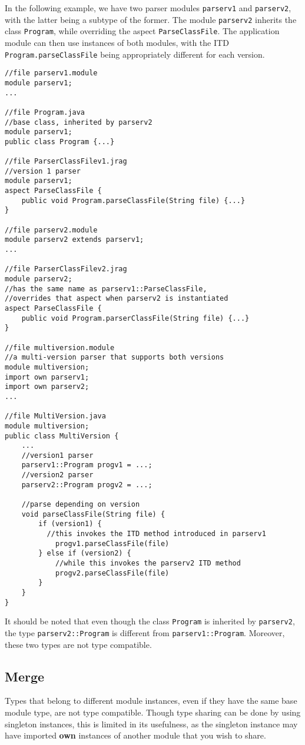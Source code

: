 In the following example, we have two parser modules \texttt{parserv1} and \texttt{parserv2},
with the latter being a subtype of the former. The module \texttt{parserv2} inherits
the class \texttt{Program}, while overriding the aspect \texttt{ParseClassFile}. The
application module can then use instances of both modules, with the ITD \texttt{Program.parseClassFile}
being appropriately different for each version.

\begin{lstlisting}
//file parserv1.module
module parserv1;
...

//file Program.java
//base class, inherited by parserv2
module parserv1;
public class Program {...}

//file ParserClassFilev1.jrag
//version 1 parser
module parserv1;
aspect ParseClassFile {
	public void Program.parseClassFile(String file) {...}
}

//file parserv2.module
module parserv2 extends parserv1;
...

//file ParserClassFilev2.jrag
module parserv2;
//has the same name as parserv1::ParseClassFile, 
//overrides that aspect when parserv2 is instantiated
aspect ParseClassFile {
	public void Program.parserClassFile(String file) {...}
}

//file multiversion.module
//a multi-version parser that supports both versions
module multiversion;
import own parserv1;
import own parserv2;
...

//file MultiVersion.java
module multiversion;
public class MultiVersion {
	...
	//version1 parser
	parserv1::Program progv1 = ...;
	//version2 parser
	parserv2::Program progv2 = ...;
	
	//parse depending on version
	void parseClassFile(String file) {
		if (version1) {
		  //this invokes the ITD method introduced in parserv1
			progv1.parseClassFile(file)
		} else if (version2) {
			//while this invokes the parserv2 ITD method
			progv2.parseClassFile(file)
		}
	}
}
\end{lstlisting}

It should be noted that even though the class \texttt{Program}
is inherited by \texttt{parserv2}, the type
\texttt{parserv2::Program} is different from \texttt{parserv1::Program}. Moreover,
these two types are not type compatible.

\subsection{Merge}

Types that belong to different module instances, even if they have the same
base module type, are not type compatible. Though type sharing can be done
by using singleton instances, this is limited in its usefulness, as the singleton
instance may have imported \textbf{own} instances of another module that you wish to
share.

